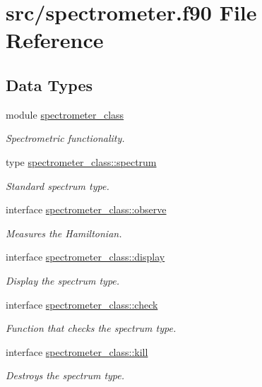\hypertarget{spectrometer_8f90}{\section{src/spectrometer.f90 File Reference}
\label{spectrometer_8f90}
}
\subsection*{Data Types}
\begin{DoxyCompactItemize}
\item 
module \hyperlink{classspectrometer__class}{spectrometer\+\_\+class}
\begin{DoxyCompactList}\small\item\em Spectrometric functionality. \end{DoxyCompactList}\item 
type \hyperlink{structspectrometer__class_1_1spectrum}{spectrometer\+\_\+class\+::spectrum}
\begin{DoxyCompactList}\small\item\em Standard spectrum type. \end{DoxyCompactList}\item 
interface \hyperlink{interfacespectrometer__class_1_1observe}{spectrometer\+\_\+class\+::observe}
\begin{DoxyCompactList}\small\item\em Measures the Hamiltonian. \end{DoxyCompactList}\item 
interface \hyperlink{interfacespectrometer__class_1_1display}{spectrometer\+\_\+class\+::display}
\begin{DoxyCompactList}\small\item\em Display the spectrum type. \end{DoxyCompactList}\item 
interface \hyperlink{interfacespectrometer__class_1_1check}{spectrometer\+\_\+class\+::check}
\begin{DoxyCompactList}\small\item\em Function that checks the spectrum type. \end{DoxyCompactList}\item 
interface \hyperlink{interfacespectrometer__class_1_1kill}{spectrometer\+\_\+class\+::kill}
\begin{DoxyCompactList}\small\item\em Destroys the spectrum type. \end{DoxyCompactList}\end{DoxyCompactItemize}
